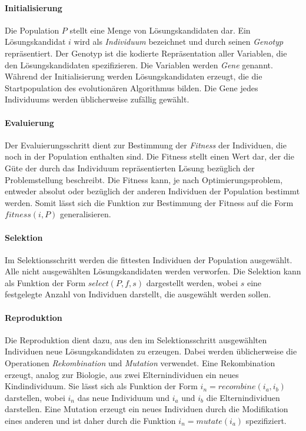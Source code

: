\paragraph{Initialisierung}

Die Population \(P\) stellt eine Menge von Lösungskandidaten dar. Ein Lösungskandidat \(i\) wird als \emph{Individuum} bezeichnet und durch seinen \emph{Genotyp} repräsentiert. Der Genotyp ist die kodierte Repräsentation aller Variablen, die den Lösungskandidaten spezifizieren. Die Variablen werden \emph{Gene} genannt. Während der Initialisierung werden Lösungskandidaten erzeugt, die die Startpopulation des evolutionären Algorithmus bilden. Die Gene jedes Individuums werden üblicherweise zufällig gewählt.

\paragraph{Evaluierung}

Der Evaluierungsschritt dient zur Bestimmung der \emph{Fitness} der Individuen, die noch in der Population enthalten sind. Die Fitness stellt einen Wert dar, der die Güte der durch das Individuum repräsentierten Lösung bezüglich der Problemstellung beschreibt. Die Fitness kann, je nach Optimierungsproblem, entweder absolut oder bezüglich der anderen Individuen der Population bestimmt werden. Somit lässt sich die Funktion zur Bestimmung der Fitness auf die Form \(fitness(i, P)\) generalisieren.

\paragraph{Selektion}

Im Selektionsschritt werden die fittesten Individuen der Population ausgewählt. Alle nicht ausgewählten Lösungskandidaten werden verworfen. Die Selektion kann als Funktion der Form \(select(P, f, s)\) dargestellt werden, wobei \(s\) eine festgelegte Anzahl von Individuen darstellt, die ausgewählt werden sollen.

\paragraph{Reproduktion}

Die Reproduktion dient dazu, aus den im Selektionsschritt ausgewählten Individuen neue Lösungskandidaten zu erzeugen. Dabei werden üblicherweise die Operationen \emph{Rekombination} und \emph{Mutation} verwendet. Eine Rekombination erzeugt, analog zur Biologie, aus zwei Elternindividuen ein neues Kindindividuum. Sie lässt sich als Funktion der Form \(i_n = recombine(i_a, i_b)\) darstellen, wobei \(i_n\) das neue Individuum und \(i_a\) und \(i_b\) die Elternindividuen darstellen. Eine Mutation erzeugt ein neues Individuen durch die Modifikation eines anderen und ist daher durch die Funktion \(i_n = mutate(i_a)\) spezifiziert.

